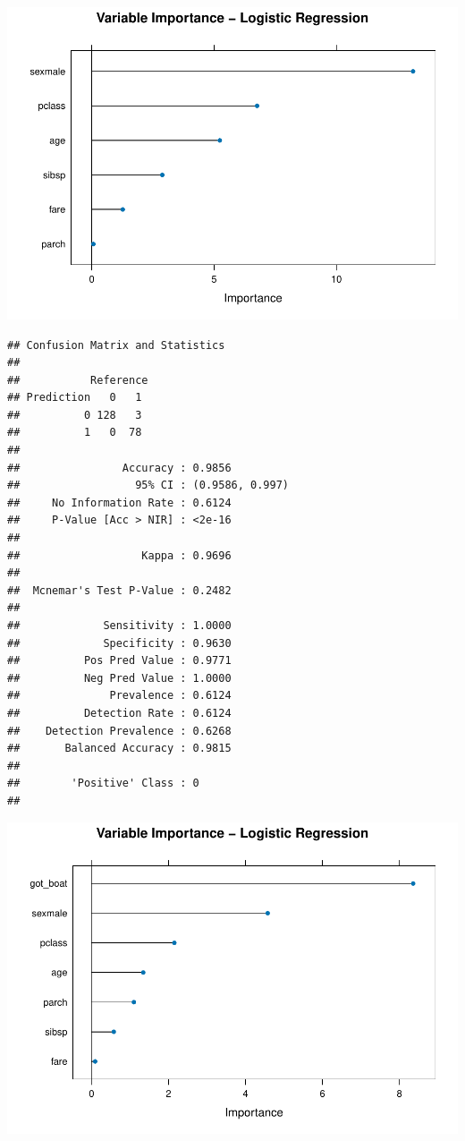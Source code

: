 \documentclass[
  11pt,
]{article}
\begin{document}
\includegraphics{README_files/figure-latex/unnamed-chunk-8-1.pdf}

\begin{verbatim}
## Confusion Matrix and Statistics
## 
##           Reference
## Prediction   0   1
##          0 128   3
##          1   0  78
##                                          
##                Accuracy : 0.9856         
##                  95% CI : (0.9586, 0.997)
##     No Information Rate : 0.6124         
##     P-Value [Acc > NIR] : <2e-16         
##                                          
##                   Kappa : 0.9696         
##                                          
##  Mcnemar's Test P-Value : 0.2482         
##                                          
##             Sensitivity : 1.0000         
##             Specificity : 0.9630         
##          Pos Pred Value : 0.9771         
##          Neg Pred Value : 1.0000         
##              Prevalence : 0.6124         
##          Detection Rate : 0.6124         
##    Detection Prevalence : 0.6268         
##       Balanced Accuracy : 0.9815         
##                                          
##        'Positive' Class : 0              
## 
\end{verbatim}

\includegraphics{README_files/figure-latex/unnamed-chunk-9-1.pdf}
\end{document}
